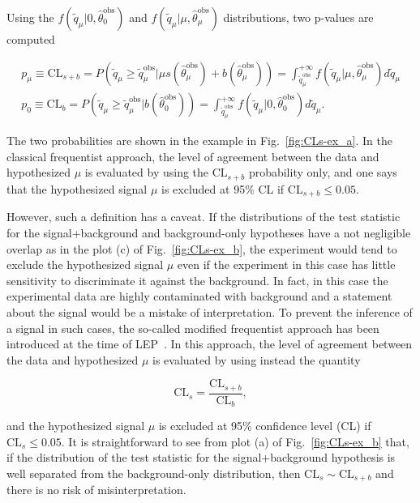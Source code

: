 Using the $f(\tilde{q}_\mu|0,\hat{\theta}_0^\mathrm{obs})$ and $f(\tilde{q}_\mu|\mu,\hat{\theta}_\mu^\mathrm{obs})$ distributions,
two p-values are computed

\begin{equation}
\begin{gathered}
p_\mu \equiv \mathrm{CL}_{s+b} = P(\tilde{q}_\mu \geq \tilde{q}_\mu^\mathrm{obs}|\mu s(\hat{\theta}_\mu^\mathrm{obs}) + b(\hat{\theta}_\mu^\mathrm{obs})) = \int_{\tilde{q}_\mu^\mathrm{obs}}^{+\infty} f(\tilde{q}_\mu|\mu,\hat{\theta}_\mu^\mathrm{obs})d\tilde{q}_\mu \\
p_0 \equiv \mathrm{CL}_{b} = P(\tilde{q}_\mu \geq \tilde{q}_\mu^\mathrm{obs}|b(\hat{\theta}_0^\mathrm{obs})) = \int_{\tilde{q}_\mu^\mathrm{obs}}^{+\infty} f(\tilde{q}_\mu|0,\hat{\theta}_0^\mathrm{obs})d\tilde{q}_\mu.
\end{gathered}
\label{eqn:pvalues}
\end{equation}

The two probabilities are shown in the example in Fig.~\ref{fig:CLs-ex_a}.
In the classical frequentist approach, the level of agreement between the data and hypothesized $\mu$ is evaluated by using the $\mathrm{CL}_{s+b}$ probability only,
and one says that the hypothesized signal $\mu$ is excluded at 95\% CL if $\mathrm{CL}_{s+b} \leq 0.05$.

However, such a definition has a caveat. If the distributions of the test statistic for the signal+background and background-only hypotheses have a not negligible overlap as in the plot (c) of Fig.~\ref{fig:CLs-ex_b},
the experiment would tend to exclude the hypothesized signal $\mu$ even if the experiment in this case has little sensitivity to discriminate it against the background.
In fact, in this case the experimental data are highly contaminated with background and a statement about the signal would be a mistake of interpretation.
To prevent the inference of a signal in such cases, the so-called modified frequentist approach has been introduced at the time of LEP~\cite{CLs1,Junk:1999kv}.
In this approach, the level of agreement between the data and hypothesized $\mu$ is evaluated by using instead the quantity 

\begin{equation}
\mathrm{CL}_s = \frac{\mathrm{CL}_{s+b}}{\mathrm{CL}_b},
\end{equation}

and the hypothesized signal $\mu$ is excluded at 95\% confidence level (CL) if $\mathrm{CL}_s \leq 0.05$.
It is straightforward to see from plot (a) of Fig.~\ref{fig:CLs-ex_b} that, if the distribution of the test statistic for the signal+background hypothesis
is well separated from the background-only distribution, then $\mathrm{CL}_s \sim \mathrm{CL}_{s+b}$ and there is no risk of misinterpretation.

